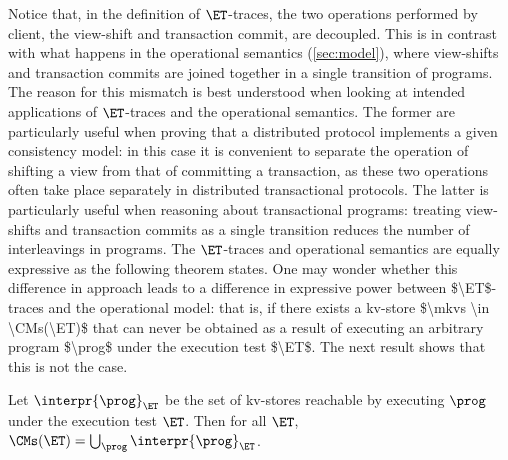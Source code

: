 Notice that, in the definition of $\ET$-traces, the two operations
performed by client, the view-shift and 
transaction commit, are decoupled. This is in contrast with what
happens in the operational semantics (\cref{sec:model}), 
where view-shifts and transaction commits are joined  together in a single transition of programs. 
The reason for this mismatch is best understood when looking at intended applications of 
$\ET$-traces and the operational semantics. The former are particularly useful when proving that a distributed 
protocol implements a given consistency model: in this case it is convenient to separate the operation of shifting a view from that of committing a transaction, 
as these two operations often take place separately in distributed transactional protocols. The latter is particularly useful when reasoning about transactional 
programs: treating view-shifts and transaction commits as a single transition reduces the number of interleavings in programs.
The $\ET$-traces and operational semantics are equally expressive as
the following theorem states. 
\ac{One may wonder whether this difference in approach leads to a difference in expressive power between $\ET$-traces 
and the operational model: that is, if there exists a kv-store $\mkvs \in \CMs(\ET)$ that can never be obtained as a 
result of executing an arbitrary program $\prog$ under the execution test $\ET$. The next result shows that 
this is not the case.}
%

\begin{theorem}
	\label{thm:ettraces2sem}
	Let $\interpr{\prog}_{\ET}$ be the set of kv-stores reachable by executing $\prog$ under the execution test $\ET$. 
    Then for all $\ET$, $\CMs(\ET) = \bigcup_{\prog} \interpr{\prog}_{\ET}$.
\end{theorem}


